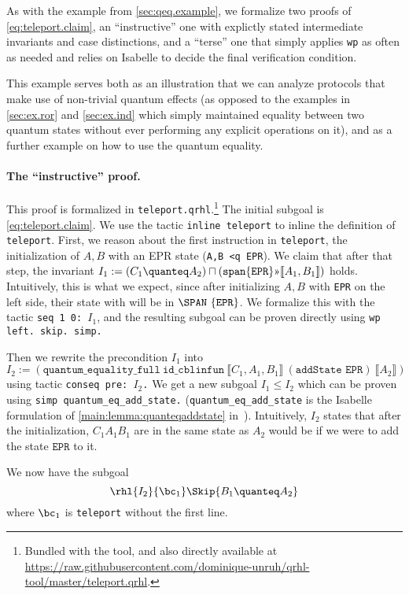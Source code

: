\documentclass{article}
\newcommand\giturl[1]{\url{https://raw.githubusercontent.com/dominique-unruh/qrhl-tool/master/#1}}
\newcommand\qrhlautoref[1]{\autoref*{main:#1} in~\cite{qrhl-paper-from-manual}}
\begin{document}
As with the example from \autoref{sec:qeq.example}, we formalize two
proofs of \eqref{eq:teleport.claim}, an ``instructive'' one with
explictly stated intermediate invariants and case distinctions, and a
``terse'' one that simply applies \texttt{wp} as often as needed and
relies on Isabelle to decide the final verification condition.

This example serves both as an illustration that we can analyze
protocols that make use of non-trivial quantum effects (as opposed to
the examples in \autoref{sec:ex.ror} and \autoref{sec:ex.ind} which
simply maintained equality between two quantum states without ever
performing any explicit operations on it), and as a further example on
how to use the quantum equality.

\paragraph{The ``instructive'' proof.} This proof is formalized in \texttt{teleport.qrhl}.\footnote{Bundled with the tool, and also directly available at \giturl{teleport.qrhl}.}
The initial subgoal is \eqref{eq:teleport.claim}. We use the tactic
\texttt{inline teleport} to inline the definition of
\texttt{teleport}. First, we reason about the first instruction in
\texttt{teleport}, the initialization of $A,B$
with an EPR state (\texttt{A,B <q EPR}). We claim that after that
step, the invariant
$I_1:={(C_1\quanteq A_2) \sqcap (\mathtt{span}
\{\mathtt{EPR}\}\text\guillemotright\llbracket A_1,B_1\rrbracket)}$
holds. Intuitively, this is what we expect, since after initializing
$A,B$
with \texttt{EPR} on the left side, their state with will be in
$\SPAN\ \{\mathtt{EPR}\}$.
We formalize this with the tactic \texttt{seq 1 0: $I_1$},
and the resulting subgoal can be proven directly using
\texttt{\frenchspacing wp left. skip. simp.}

Then we rewrite the precondition $I_1$
into
\[
  I_2:=(\mathtt{quantum\_equality\_full}\ \mathtt{id\_cblinfun}\ ⟦C_1,A_1,B_1⟧\
  (\texttt{addState EPR})\ ⟦A_2⟧)
\] using tactic \texttt{\frenchspacing conseq pre: $I_2$.}
We get a new subgoal $I_1\leq I_2$
which can be proven using \texttt{simp quantum\_eq\_add\_state.}
(\texttt{quantum\_eq\_add\_state} is the Isabelle formulation of
\qrhlautoref{lemma:quanteqaddstate}). Intuitively, $I_2$
states that after the initialization, $C_1A_1B_1$
are in the same state as $A_2$
would be if we were to add the state $\mathtt{EPR}$ to it.


We now have the subgoal
\[
\rhl{I_2}{\bc_1}\Skip{B_1\quanteq A_2}
\]
where $\bc_1$ is \texttt{teleport} without the first line.
\end{document}
